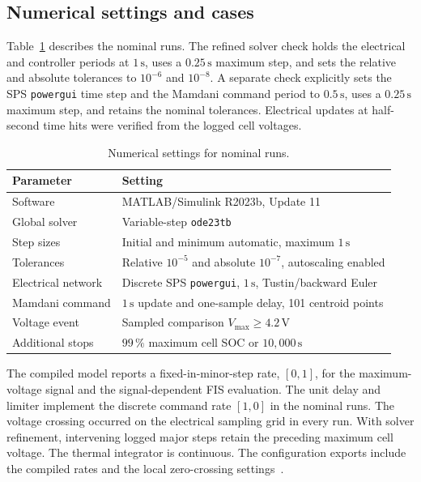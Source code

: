 \documentclass[a4paper,10pt,twocolumn]{article}
\begin{document}
\subsection{Numerical settings and cases}
Table~\ref{tab:solver} describes the nominal runs. The refined solver check holds the electrical and controller periods at $1\,\mathrm{s}$, uses a $0.25\,\mathrm{s}$ maximum step, and sets the relative and absolute tolerances to $10^{-6}$ and $10^{-8}$. A separate check explicitly sets the SPS \texttt{powergui} time step and the Mamdani command period to $0.5\,\mathrm{s}$, uses a $0.25\,\mathrm{s}$ maximum step, and retains the nominal tolerances. Electrical updates at half-second time hits were verified from the logged cell voltages.

\begin{table}[htbp]
\centering\small
\caption{Numerical settings for nominal runs.}
\label{tab:solver}
\begin{tabular}{@{}p{}p{}@{}}
\toprule
Parameter & Setting\\
\midrule
Software & MATLAB/Simulink R2023b, Update 11\\
Global solver & Variable-step \texttt{ode23tb}\\
Step sizes & Initial and minimum automatic, maximum $1\,\mathrm{s}$\\
Tolerances & Relative $10^{-5}$ and absolute $10^{-7}$, autoscaling enabled\\
Electrical network & Discrete SPS \texttt{powergui}, $1\,\mathrm{s}$, Tustin/backward Euler\\
Mamdani command & $1\,\mathrm{s}$ update and one-sample delay, 101 centroid points\\
Voltage event & Sampled comparison $V_{\max}\ge4.2\,\mathrm{V}$\\
Additional stops & $99\,\%$ maximum cell SOC or $10{,}000\,\mathrm{s}$\\
\bottomrule
\end{tabular}
\end{table}

The compiled model reports a fixed-in-minor-step rate, $[0,1]$, for the maximum-voltage signal and the signal-dependent FIS evaluation. The unit delay and limiter implement the discrete command rate $[1,0]$ in the nominal runs. The voltage crossing occurred on the electrical sampling grid in every run. With solver refinement, intervening logged major steps retain the preceding maximum cell voltage. The thermal integrator is continuous. The configuration exports include the compiled rates and the local zero-crossing settings~\cite{mathworks_sample}.
\end{document}
